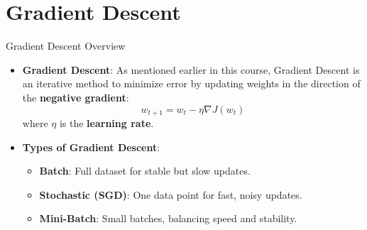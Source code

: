 \documentclass[serif, aspectratio=169]{beamer}
\begin{document}
\section{Gradient Descent}
\begin{frame}{Gradient Descent Overview}
    \begin{itemize}
        \item \textbf{Gradient Descent}: As mentioned earlier in this course, Gradient Descent is an iterative method to minimize error by updating weights in the direction of the \textbf{negative gradient}:
        \[
        w_{t+1} = w_t - \eta \nabla J(w_t)
        \]
        where $\eta$ is the \textbf{learning rate}.
    \end{itemize}
    \begin{itemize}
        \item \textbf{Types of Gradient Descent}:
        \begin{itemize}
            \item \textbf{Batch}: Full dataset for stable but slow updates.
            \item \textbf{Stochastic (SGD)}: One data point for fast, noisy updates.
            \item \textbf{Mini-Batch}: Small batches, balancing speed and stability.
        \end{itemize}
    \end{itemize}
\end{frame}
\end{document}
